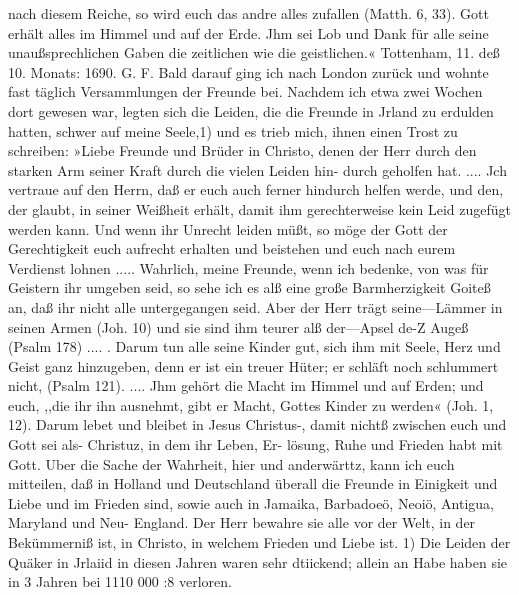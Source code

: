 nach diesem Reiche, so wird euch das andre alles zufallen
(Matth. 6, 33). Gott erhält alles im Himmel und auf der Erde.
Jhm sei Lob und Dank für alle seine unaußsprechlichen Gaben
die zeitlichen wie die geistlichen.«
Tottenham, 11. deß 10. Monats: 1690. G. F.
Bald darauf ging ich nach London zurück und wohnte fast
täglich Versammlungen der Freunde bei. Nachdem ich etwa zwei
Wochen dort gewesen war, legten sich die Leiden, die die Freunde
in Jrland zu erdulden hatten, schwer auf meine Seele,1) und es
trieb mich, ihnen einen Trost zu schreiben:
»Liebe Freunde und Brüder in Christo, denen der Herr
durch den starken Arm seiner Kraft durch die vielen Leiden hin-
durch geholfen hat. .... Jch vertraue auf den Herrn, daß er
euch auch ferner hindurch helfen werde, und den, der glaubt, in
seiner Weißheit erhält, damit ihm gerechterweise kein Leid zugefügt
werden kann. Und wenn ihr Unrecht leiden müßt, so möge der
Gott der Gerechtigkeit euch aufrecht erhalten und beistehen und
euch nach eurem Verdienst lohnen ..... Wahrlich, meine Freunde,
wenn ich bedenke, von was für Geistern ihr umgeben seid, so
sehe ich es alß eine große Barmherzigkeit Goiteß an, daß ihr
nicht alle untergegangen seid. Aber der Herr trägt seine—Lämmer
in seinen Armen (Joh. 10) und sie sind ihm teurer alß der—Apsel
de-Z Augeß (Psalm 178) .... . Darum tun alle seine Kinder gut,
sich ihm mit Seele, Herz und Geist ganz hinzugeben, denn er
ist ein treuer Hüter; er schläft noch schlummert nicht, (Psalm 121).
.... Jhm gehört die Macht im Himmel und auf Erden; und
euch, ,,die ihr ihn ausnehmt, gibt er Macht, Gottes Kinder zu
werden« (Joh. 1, 12).
Darum lebet und bleibet in Jesus Christus-, damit nichtß
zwischen euch und Gott sei als- Christuz, in dem ihr Leben, Er-
lösung, Ruhe und Frieden habt mit Gott.
Uber die Sache der Wahrheit, hier und anderwärttz, kann
ich euch mitteilen, daß in Holland und Deutschland überall die
Freunde in Einigkeit und Liebe und im Frieden sind, sowie auch
in Jamaika, Barbadoeö, Neoiö, Antigua, Maryland und Neu-
England. Der Herr bewahre sie alle vor der Welt, in der
Bekümmerniß ist, in Christo, in welchem Frieden und Liebe ist.
1) Die Leiden der Quäker in Jrlaiid in diesen Jahren waren sehr
dtiickend; allein an Habe haben sie in 3 Jahren bei 1110 000 :8 verloren.


